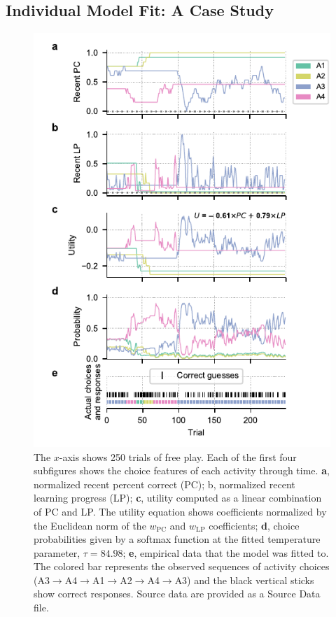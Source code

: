 \begin{subappendices}
\section{Individual Model Fit: A Case Study}\label{CH4A_S_individual_model_fit}

\begin{figure}[bh!]
    \centering
    \includegraphics[width=.75\columnwidth]{Figures/c4/fig_s5.pdf}
    \caption[short Appendix figure description]{The $x$-axis shows 250 trials of free play. Each of the first four subfigures shows the choice features of each activity through time. \textbf{a}, normalized recent percent correct (PC); b, normalized recent learning progress (LP); \textbf{c}, utility computed as a linear combination of \ac{PC} and \ac{LP}. The utility equation shows coefficients normalized by the Euclidean norm of the $w_{\mathrm{PC}}$ and $w_{\mathrm{LP}}$ coefficients; \textbf{d}, choice probabilities given by a softmax function at the fitted temperature parameter, $\tau = 84.98$; \textbf{e}, empirical data that the model was fitted to. The colored bar represents the observed sequences of activity choices (A3$\rightarrow$A4$\rightarrow$A1$\rightarrow$A2$\rightarrow$A4$\rightarrow$A3) and the black vertical sticks show correct responses. Source data are provided as a Source Data file.}
    \label{fig:CH4A_5_individual_model_fit}
\end{figure}


\end{subappendices}

